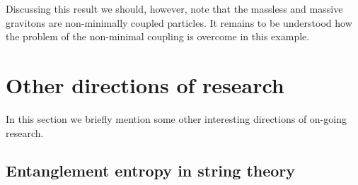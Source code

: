 \documentclass[12pt]{article}
\begin{document}
Discussing this result we should, however, note that the massless and massive gravitons are non-minimally coupled particles.  It remains to be understood how the problem of the non-minimal coupling   is overcome   in this example.
             
             
             
             
             
\section{Other directions of research}
In this section we briefly mention some other interesting directions of  on-going research.

\subsection{Entanglement entropy in string theory}
\end{document}
